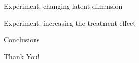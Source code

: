 \documentclass[10pt]{beamer}
\begin{document}
\begin{frame}{Experiment: changing latent dimension}
    
\end{frame}

\begin{frame}{Experiment: increasing the treatment effect}
    
\end{frame}

\begin{frame}{Conclusions}
    
\end{frame}

{
\begin{frame}[standout]
\thispagestyle{empty}
  {\LARGE Thank You!}
\end{frame}
}
\end{document}

